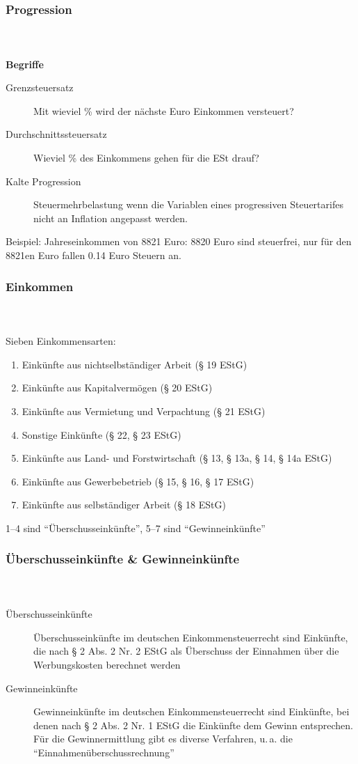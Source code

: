 \documentclass[ngerman]{beamer}
\begin{document}
\begin{frame}
\frametitle{Progression}
\framesubtitle{~}

\textbf{Begriffe}

\begin{description}
\item[Grenzsteuersatz] Mit wieviel \% wird der nächste Euro Einkommen versteuert?
\item[Durchschnittssteuersatz] Wieviel \% des Einkommens gehen für die ESt drauf?
\item[Kalte Progression] Steuermehrbelastung wenn die Variablen eines progressiven Steuertarifes nicht an Inflation angepasst werden.
\end{description}

Beispiel: Jahreseinkommen von 8821 Euro: 8820 Euro sind steuerfrei, nur für den 8821en Euro fallen 0.14 Euro Steuern an.



\end{frame}

\begin{frame}
\frametitle{Einkommen}
\framesubtitle{~}

Sieben Einkommensarten:

\begin{enumerate}
\item Einkünfte aus nichtselbständiger Arbeit (§ 19 EStG)
\item Einkünfte aus Kapitalvermögen (§ 20 EStG)
\item Einkünfte aus Vermietung und Verpachtung (§ 21 EStG)
\item Sonstige Einkünfte (§ 22, § 23 EStG)
\item Einkünfte aus Land- und Forstwirtschaft (§ 13, § 13a, § 14, § 14a EStG)
\item Einkünfte aus Gewerbebetrieb (§ 15, § 16, § 17 EStG)
\item Einkünfte aus selbständiger Arbeit (§ 18 EStG)
\end{enumerate}

1--4 sind \enquote{Überschusseinkünfte}, 5--7 sind \enquote{Gewinneinkünfte}

\end{frame}

\begin{frame}
\frametitle{Überschusseinkünfte \& Gewinneinkünfte}
\framesubtitle{~}

\begin{description}
\item[Überschusseinkünfte] Überschusseinkünfte im deutschen Einkommensteuerrecht sind Einkünfte, die nach § 2 Abs. 2 Nr. 2 EStG als Überschuss der Einnahmen über die Werbungskosten berechnet werden
\item[Gewinneinkünfte] Gewinneinkünfte im deutschen Einkommensteuerrecht sind Einkünfte, bei denen nach § 2 Abs. 2 Nr. 1 EStG die Einkünfte dem Gewinn entsprechen. \newline Für die Gewinnermittlung gibt es diverse Verfahren, u.\,a. die \enquote{Einnahmenüberschussrechnung}
\end{description}

\end{frame}


\end{document}
